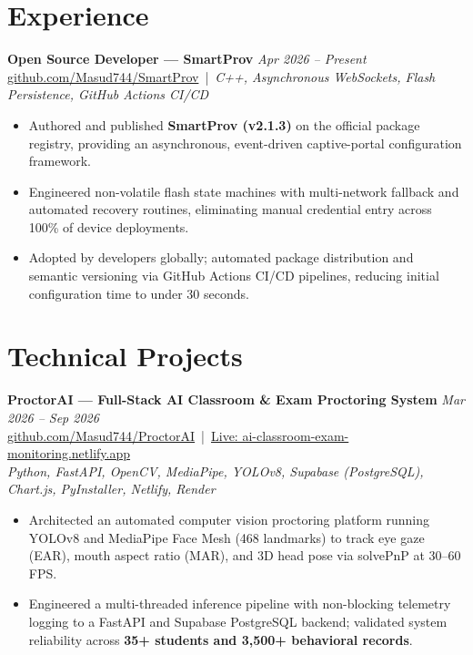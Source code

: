 \documentclass[10pt,a4paper]{article}
\begin{document}
\section*{Experience}

\textbf{Open Source Developer --- SmartProv} \hfill \textit{Apr 2026 -- Present} \\
\href{https://github.com/Masud744/SmartProv}{github.com/Masud744/SmartProv} \,|\, \textit{C++, Asynchronous WebSockets, Flash Persistence, GitHub Actions CI/CD}
\begin{itemize}
    \item Authored and published \textbf{SmartProv (v2.1.3)} on the official package registry, providing an asynchronous, event-driven captive-portal configuration framework.
    \item Engineered non-volatile flash state machines with multi-network fallback and automated recovery routines, eliminating manual credential entry across 100\% of device deployments.
    \item Adopted by developers globally; automated package distribution and semantic versioning via GitHub Actions CI/CD pipelines, reducing initial configuration time to under 30 seconds.
\end{itemize}

\section*{Technical Projects}

\textbf{ProctorAI --- Full-Stack AI Classroom \& Exam Proctoring System} \hfill \textit{Mar 2026 -- Sep 2026} \\
\href{https://github.com/Masud744/ProctorAI}{github.com/Masud744/ProctorAI} \,|\, \href{https://ai-classroom-exam-monitoring.netlify.app}{Live: ai-classroom-exam-monitoring.netlify.app} \\
\textit{Python, FastAPI, OpenCV, MediaPipe, YOLOv8, Supabase (PostgreSQL), Chart.js, PyInstaller, Netlify, Render}
\begin{itemize}
    \item Architected an automated computer vision proctoring platform running YOLOv8 and MediaPipe Face Mesh (468 landmarks) to track eye gaze (EAR), mouth aspect ratio (MAR), and 3D head pose via solvePnP at 30--60 FPS.
    \item Engineered a multi-threaded inference pipeline with non-blocking telemetry logging to a FastAPI and Supabase PostgreSQL backend; validated system reliability across \textbf{35+ students and 3,500+ behavioral records}.
\end{itemize}
\end{document}
